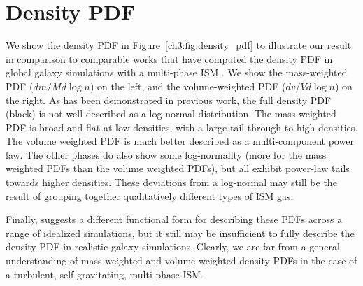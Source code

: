 
%
%



\setcounter{section}{0}%
\renewcommand\thesection{\thechapter.\Alph{section}}


\section{Density PDF}
\label{ch3:appendix:density PDF}
We show the density PDF in Figure~\ref{ch3:fig:density_pdf} to illustrate our result in comparison to comparable works that have computed the density PDF in global galaxy simulations with a multi-phase ISM \citep{Joung2009, Tasker2009, Tasker2011, Tasker2015,HQM2012}. We show the mass-weighted PDF ($dm/Md\log n$) on the left, and the volume-weighted PDF ($dv/Vd\log n$) on the right. As has been demonstrated in previous work, the full density PDF (black) is not well described as a log-normal distribution. The mass-weighted PDF is broad and flat at low densities, with a large tail through to high densities.   The volume weighted PDF is much better described as a multi-component power law. The other phases do also show some log-normality (more for the mass weighted PDFs than the volume weighted PDFs), but all exhibit power-law tails towards higher densities. These deviations from a log-normal may still be the result of grouping together qualitatively different types of ISM gas.

Finally, \cite{Hopkins2013} suggests a different functional form for describing these PDFs across a range of idealized simulations, but it still may be insufficient to fully describe the density PDF in realistic galaxy simulations. Clearly, we are far from a general understanding of mass-weighted and volume-weighted density PDFs in the case of a turbulent, self-gravitating, multi-phase ISM.

